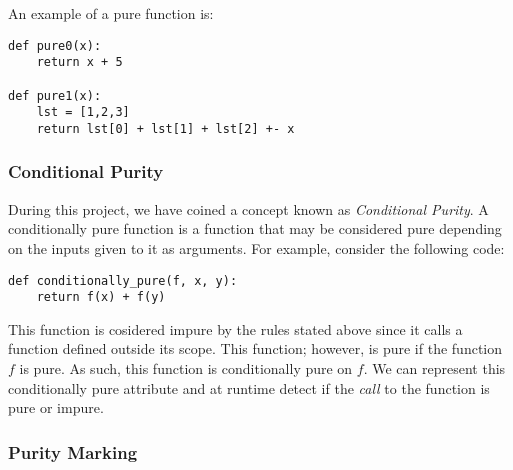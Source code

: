 \documentclass{acm_proc_article-sp}
\begin{document}
An example of a pure function is:

\begin{verbatim}
def pure0(x):
    return x + 5

def pure1(x):
    lst = [1,2,3]
    return lst[0] + lst[1] + lst[2] +- x
\end{verbatim}

\subsubsection*{Conditional Purity}

During this project, we have coined a concept known as \emph{Conditional
Purity}. A conditionally pure function is a function that may be considered
pure depending on the inputs given to it as arguments. For example, consider
the following code:


\begin{verbatim}
def conditionally_pure(f, x, y):
    return f(x) + f(y)
\end{verbatim}

This function is cosidered impure by the rules stated above since it calls a function defined outside
its scope. This function; however, is pure if the function $f$ is pure. As such, this function is
conditionally pure on $f$. We can represent this conditionally pure attribute and at runtime detect
if the \emph{call} to the function is pure or impure.

\subsubsection{Purity Marking}
\end{document}
